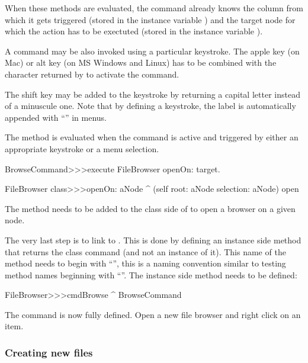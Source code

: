 \documentclass[a4paper,10pt,twoside]{book}
\begin{document}
When these methods are evaluated, the command already knows the column from which it gets triggered (stored in the instance variable ) and the target node for which the action has to be exectuted (stored in the instance variable ). 

A command may be also invoked using a particular keystroke. The apple key (on Mac) or alt key (on MS Windows and Linux) has to be combined with the character returned by  to activate the command.

The shift key may be added to the keystroke by returning a capital letter instead of a minuscule one. Note that by defining a keystroke, the label is automatically appended with ``'' in menus.

The method  is evaluated when the command is active and triggered by either an appropriate keystroke or a menu selection.
\begin{code}{}    
BrowseCommand>>>execute
	FileBrowser openOn: target.

FileBrowser class>>>openOn: aNode 
	^ (self root: aNode selection: aNode) open
\end{code}

The method  needs to be added to the class side of  to open a browser on a given node. 

The very last step is to link  to . This is done by defining an instance side method that returns the class command (and not an instance of it). This name of the method needs to begin with ``'', this is a naming convention similar to testing method names beginning with ``''. The instance side method needs to be defined:

\begin{code}{}    
FileBrowser>>>cmdBrowse
	^ BrowseCommand
\end{code}

The command is now fully defined. Open a new file browser and right click on an item.

\subsubsection{Creating new files}
\end{document}
